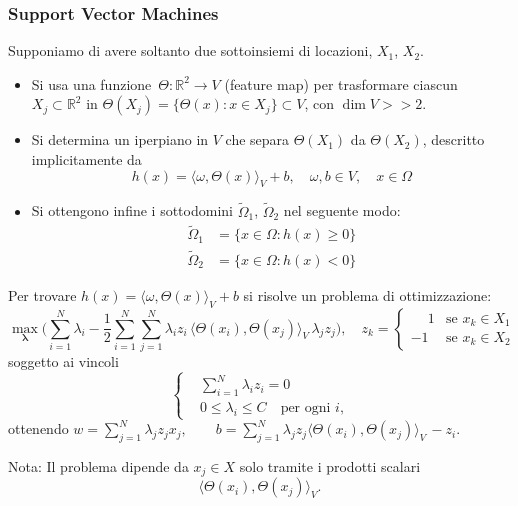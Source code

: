 \documentclass[10pt]{beamer}
\theoremstyle{definition}
\theoremstyle{plain}
\def\R{\mathbb R}
\begin{document}
\begin{frame}
\frametitle{Support Vector Machines}
Supponiamo di avere soltanto due sottoinsiemi di locazioni, $X_1$, $X_2$.
\begin{itemize}
\item Si usa una funzione~$\Theta:\R^2\to V$ (\alert{feature map}) per trasformare ciascun $X_j\subset\R^2$ in $\Theta(X_j) = \{\Theta(x):x\in X_j\}\subset V$, con $\dim V >> 2$.
\item Si determina un iperpiano in $V$ che separa $\Theta(X_1)$ da $\Theta(X_2)$, descritto implicitamente da
$$
h(x) = \langle \omega, \Theta(x) \rangle_V + b, \quad \omega, b\in V, \quad x\in\Omega
$$
\item Si ottengono infine i sottodomini $\widetilde\Omega_1$, $\widetilde\Omega_2$ nel seguente modo:
$$
\begin{aligned}
\widetilde\Omega_1 &= \{x\in \Omega : h(x) \geq 0\}\\
\widetilde\Omega_2 &= \{x\in \Omega : h(x) < 0\}
\end{aligned}
$$
\end{itemize}
\end{frame}


\begin{frame}
Per trovare $h(x) = \langle \omega, \Theta(x) \rangle_V + b$ si risolve un problema di ottimizzazione:
$$
\max_{\bm \lambda}\biggl(\sum_{i=1}^N\lambda_i - {\frac12}\sum_{i=1}^N\sum_{j=1}^N\lambda_i z_i\,\langle \Theta(x_i), \Theta(x_j)\rangle_V\, \lambda_j z_j\biggr), \quad z_k = \begin{cases}\phantom-1 & \text{se $x_k\in X_1$}\\
			-1 & \text{se $x_k\in X_2$}
\end{cases}
$$
soggetto ai vincoli
$$
\left\{\begin{aligned}&\textstyle\sum_{i=1}^N\lambda_i z_i = 0\\
                & 0\leq\lambda_i\leq C\quad\text{per ogni~$i$,}\end{aligned}\right.
$$
ottenendo $w = \sum_{j=1}^N \lambda_j z_j x_j, \qquad b =\sum_{j=1}^N\lambda_j z_j\langle \Theta(x_i), \Theta(x_j)\rangle_V\, - z_i$.


\bigskip

\alert{Nota}: Il problema dipende da $x_j\in X$ solo tramite i prodotti scalari 
$$\langle \Theta(x_i), \Theta(x_j)\rangle_V.$$
\end{frame}
\end{document}
